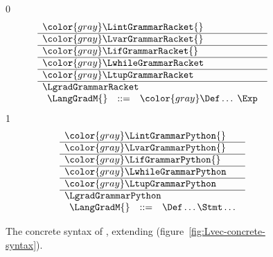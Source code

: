 \documentclass[7x10]{TimesAPriori_MIT}%
\newcommand{\gray}[1]{{\color{gray} #1}}
\def\racketEd{0}
\def\pythonEd{1}
\def\edition{1}
\newcommand{\pythonColor}[0]{}
\numberwithin{theorem}{chapter}
\numberwithin{definition}{chapter}
\numberwithin{equation}{chapter}
\begin{document}
\begin{figure}[tbp]
\centering
\begin{tcolorbox}[colback=white]
  \vspace{-5pt}
    \small
{\if\edition\racketEd    
\[
\begin{array}{l}
  \gray{\LintGrammarRacket{}} \\ \hline
  \gray{\LvarGrammarRacket{}} \\ \hline
  \gray{\LifGrammarRacket{}} \\ \hline
  \gray{\LwhileGrammarRacket} \\ \hline
  \gray{\LtupGrammarRacket} \\   \hline
  \LgradGrammarRacket \\
\begin{array}{lcl}
  \LangGradM{} &::=& \gray{\Def\ldots \; \Exp}
\end{array}
\end{array}
\]
\fi}
{\if\edition\pythonEd\pythonColor
\[
\begin{array}{l}
  \gray{\LintGrammarPython{}} \\ \hline
  \gray{\LvarGrammarPython{}} \\ \hline
  \gray{\LifGrammarPython{}} \\ \hline
  \gray{\LwhileGrammarPython} \\ \hline
  \gray{\LtupGrammarPython} \\   \hline
  \LgradGrammarPython \\
  \begin{array}{lcl}
    \LangGradM{} &::=& \Def\ldots \Stmt\ldots
  \end{array}
\end{array}
\]
\fi}
\end{tcolorbox}

\caption{The concrete syntax of \LangGrad{}, extending \LangVec{} (figure~\ref{fig:Lvec-concrete-syntax}).}
\label{fig:Lgrad-concrete-syntax}
\end{figure}
\end{document}
